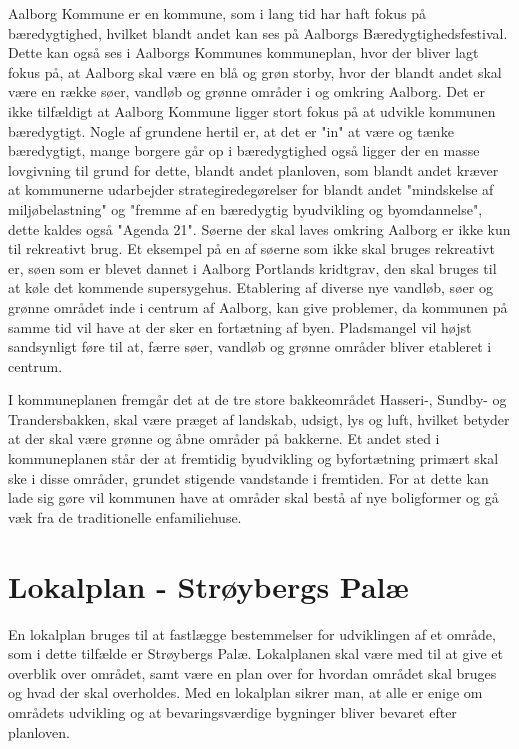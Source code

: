 Aalborg Kommune er en kommune, som i lang tid har haft fokus på bæredygtighed, hvilket blandt andet kan ses på Aalborgs Bæredygtighedsfestival. Dette kan også ses i Aalborgs Kommunes kommuneplan, hvor der bliver lagt fokus på, at Aalborg skal være en blå og grøn storby, hvor der blandt andet skal være en række søer, vandløb og grønne områder i og omkring Aalborg. Det er ikke tilfældigt at Aalborg Kommune ligger stort fokus på at udvikle kommunen bæredygtigt. Nogle af grundene hertil er, at det er "in" at være og tænke bæredygtigt, mange borgere går op i bæredygtighed også ligger der en masse lovgivning til grund for dette, blandt andet planloven, som blandt andet kræver at kommunerne udarbejder strategiredegørelser for blandt andet "mindskelse af miljøbelastning" og "fremme af en bæredygtig byudvikling og byomdannelse", dette kaldes også "Agenda 21". Søerne der skal laves omkring Aalborg er ikke kun til rekreativt brug. Et eksempel på en af søerne som ikke skal bruges rekreativt er, søen som er blevet dannet i Aalborg Portlands kridtgrav, den skal bruges til at køle det kommende supersygehus. Etablering af diverse nye vandløb, søer og grønne området inde i centrum af Aalborg, kan give problemer, da kommunen på samme tid vil have at der sker en fortætning af byen. Pladsmangel vil højst sandsynligt føre til at, færre søer, vandløb og grønne områder bliver etableret i centrum. 

I kommuneplanen fremgår det at de tre store bakkeområdet Hasseri-, Sundby- og Trandersbakken, skal være præget af landskab, udsigt, lys og luft, hvilket betyder at der skal være grønne og åbne områder på bakkerne. Et andet sted i kommuneplanen står der at fremtidig byudvikling og byfortætning primært skal ske i disse områder, grundet stigende vandstande i fremtiden. For at dette kan lade sig gøre vil kommunen have at områder skal bestå af nye boligformer og gå væk fra de traditionelle enfamiliehuse.



\section{Lokalplan - Strøybergs Palæ}
En lokalplan bruges til at fastlægge bestemmelser for udviklingen af et område, som i dette tilfælde er Strøybergs Palæ. Lokalplanen skal være med til at give et overblik over området, samt være en plan over for hvordan området skal bruges og hvad der skal overholdes. Med en lokalplan sikrer man, at alle er enige om områdets udvikling og at bevaringsværdige bygninger bliver bevaret efter planloven. 

